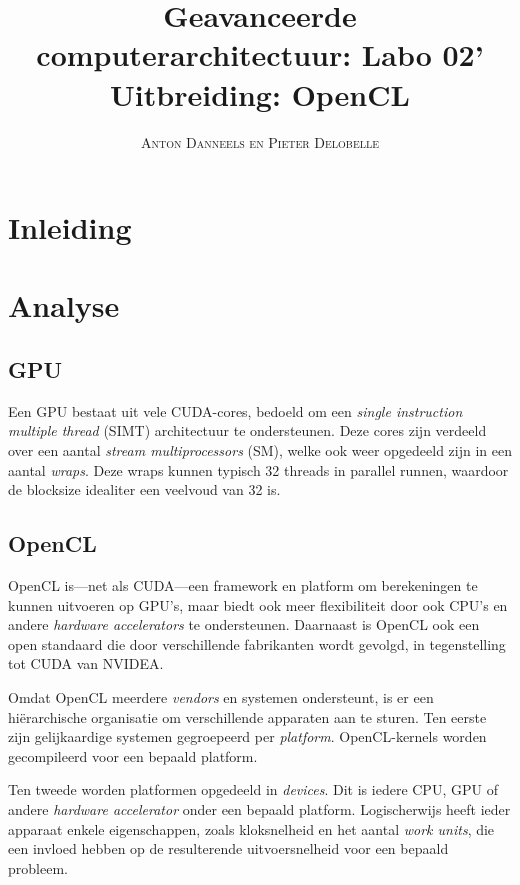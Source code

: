 \documentclass[twocolumn, a4paper]{article}
\begin{document}
\title{Geavanceerde computerarchitectuur: Labo 02' \\ 
\large{Uitbreiding: OpenCL}}
\author{\textsc{Anton Danneels en Pieter Delobelle}}
\date{}
\maketitle

\section{Inleiding}


\section{Analyse}

\subsection{GPU}
Een GPU bestaat uit vele CUDA-cores, bedoeld om een \emph{single instruction multiple thread} (SIMT) architectuur te ondersteunen. Deze cores zijn verdeeld over een aantal \emph{stream multiprocessors} (SM), welke ook weer opgedeeld zijn in een aantal \emph{wraps}. Deze wraps kunnen typisch 32 threads in parallel runnen, waardoor de blocksize idealiter een veelvoud van 32 is.

\subsection{OpenCL}
OpenCL is---net als CUDA---een framework en platform om berekeningen te kunnen uitvoeren op GPU's, maar biedt ook meer flexibiliteit door ook CPU's en andere \emph{hardware accelerators} te ondersteunen. Daarnaast is OpenCL ook een open standaard die door verschillende fabrikanten wordt gevolgd, in tegenstelling tot CUDA van NVIDEA.

Omdat OpenCL meerdere \emph{vendors} en systemen ondersteunt, is er een hiërarchische organisatie om verschillende apparaten aan te sturen. Ten eerste zijn gelijkaardige systemen gegroepeerd per \emph{platform}. OpenCL-kernels worden gecompileerd voor een bepaald platform. 

Ten tweede worden platformen opgedeeld in \emph{devices}. Dit is iedere CPU, GPU of andere \emph{hardware accelerator} onder een bepaald platform. Logischerwijs heeft ieder apparaat enkele eigenschappen, zoals kloksnelheid en het aantal \emph{work units}, die een invloed hebben op de resulterende uitvoersnelheid voor een bepaald probleem.
\end{document}
